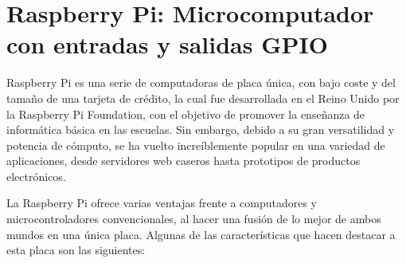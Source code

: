 \section{Raspberry Pi: Microcomputador con entradas y salidas GPIO}
Raspberry Pi es una serie de computadoras de placa única, con  bajo coste y del tamaño de una tarjeta de crédito, la cual fue desarrollada en el Reino Unido por la Raspberry Pi Foundation, con el objetivo de promover la enseñanza de informática básica en las escuelas. Sin embargo, debido a su gran versatilidad y potencia de cómputo, se ha vuelto increíblemente popular en una variedad de aplicaciones, desde servidores web caseros hasta prototipos de productos electrónicos.

La Raspberry Pi ofrece varias ventajas frente a computadores y microcontroladores convencionales, al hacer una fusión de lo mejor de ambos mundos en una única placa. Algunas de las características que hacen destacar a esta placa son las siguientes:
